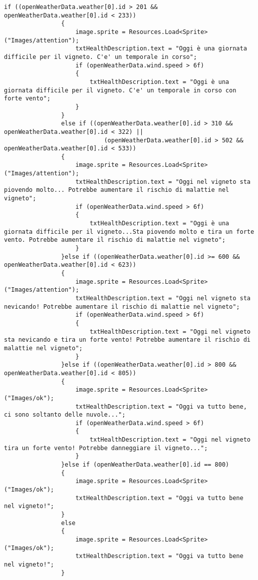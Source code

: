 \begin{lstlisting}[caption=Codice sorgente dello script \textit{OpenWeatherAPICaller}, label=lst:OpenWeatherAPICallerScript, captionpos=b, basicstyle=\scriptsize]
                if ((openWeatherData.weather[0].id > 201 && openWeatherData.weather[0].id < 233))
                {
                    image.sprite = Resources.Load<Sprite>("Images/attention");
                    txtHealthDescription.text = "Oggi è una giornata difficile per il vigneto. C'e' un temporale in corso";
                    if (openWeatherData.wind.speed > 6f)
                    {
                        txtHealthDescription.text = "Oggi è una giornata difficile per il vigneto. C'e' un temporale in corso con forte vento";
                    }
                }
                else if ((openWeatherData.weather[0].id > 310 && openWeatherData.weather[0].id < 322) ||
                            (openWeatherData.weather[0].id > 502 && openWeatherData.weather[0].id < 533))
                {
                    image.sprite = Resources.Load<Sprite>("Images/attention");
                    txtHealthDescription.text = "Oggi nel vigneto sta piovendo molto... Potrebbe aumentare il rischio di malattie nel vigneto";
                    if (openWeatherData.wind.speed > 6f)
                    {
                        txtHealthDescription.text = "Oggi è una giornata difficile per il vigneto...Sta piovendo molto e tira un forte vento. Potrebbe aumentare il rischio di malattie nel vigneto";
                    }
                }else if ((openWeatherData.weather[0].id >= 600 && openWeatherData.weather[0].id < 623))
                {
                    image.sprite = Resources.Load<Sprite>("Images/attention");
                    txtHealthDescription.text = "Oggi nel vigneto sta nevicando! Potrebbe aumentare il rischio di malattie nel vigneto";
                    if (openWeatherData.wind.speed > 6f)
                    {
                        txtHealthDescription.text = "Oggi nel vigneto sta nevicando e tira un forte vento! Potrebbe aumentare il rischio di malattie nel vigneto";
                    }
                }else if ((openWeatherData.weather[0].id > 800 && openWeatherData.weather[0].id < 805))
                {
                    image.sprite = Resources.Load<Sprite>("Images/ok");
                    txtHealthDescription.text = "Oggi va tutto bene, ci sono soltanto delle nuvole...";
                    if (openWeatherData.wind.speed > 6f)
                    {
                        txtHealthDescription.text = "Oggi nel vigneto tira un forte vento! Potrebbe danneggiare il vigneto...";
                    }
                }else if (openWeatherData.weather[0].id == 800)
                {
                    image.sprite = Resources.Load<Sprite>("Images/ok");
                    txtHealthDescription.text = "Oggi va tutto bene nel vigneto!";
                }
                else
                {
                    image.sprite = Resources.Load<Sprite>("Images/ok");
                    txtHealthDescription.text = "Oggi va tutto bene nel vigneto!";
                }
                

\end{lstlisting}
